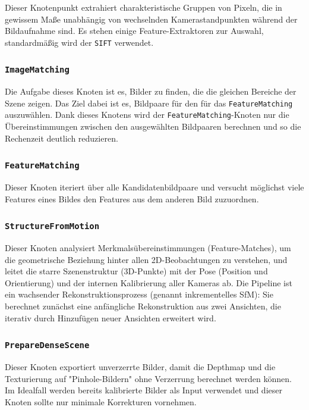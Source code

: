 \documentclass[german,notitlepage,smartquotes]{hgbreport}
\begin{document}
Dieser Knotenpunkt extrahiert charakteristische Gruppen von Pixeln, die in gewissem Maße unabhängig von wechselnden Kamerastandpunkten während der Bildaufnahme sind.
Es stehen einige Feature-Extraktoren zur Auswahl, standardmäßig wird der \texttt{SIFT} verwendet.

\subsubsection{\texttt{ImageMatching}}

Die Aufgabe dieses Knoten ist es, Bilder zu finden, die die gleichen Bereiche der Szene zeigen.
Das Ziel dabei ist es, Bildpaare für den für das \texttt{FeatureMatching} auszuwählen.
Dank dieses Knotens wird der \texttt{FeatureMatching}-Knoten nur die Übereinstimmungen zwischen den ausgewählten Bildpaaren berechnen und so die Rechenzeit deutlich reduzieren.

\subsubsection{\texttt{FeatureMatching}}

Dieser Knoten iteriert über alle Kandidatenbildpaare und versucht möglichst viele Features eines Bildes den Features aus dem anderen Bild zuzuordnen.

\subsubsection{\texttt{StructureFromMotion}}

Dieser Knoten analysiert Merkmalsübereinstimmungen (Feature-Matches), um die geometrische Beziehung hinter allen 2D-Beobachtungen zu verstehen, und leitet die starre Szenenstruktur (3D-Punkte) mit der Pose (Position und Orientierung) und der internen Kalibrierung aller Kameras ab. Die Pipeline ist ein wachsender Rekonstruktionsprozess (genannt inkrementelles SfM): Sie berechnet zunächst eine anfängliche Rekonstruktion aus zwei Ansichten, die iterativ durch Hinzufügen neuer Ansichten erweitert wird.

\subsubsection{\texttt{PrepareDenseScene}}

Dieser Knoten exportiert unverzerrte Bilder, damit die Depthmap und die Texturierung auf "Pinhole-Bildern" ohne Verzerrung berechnet werden können.
Im Idealfall werden bereits kalibrierte Bilder als Input verwendet und dieser Knoten sollte nur minimale Korrekturen vornehmen.
\end{document}
